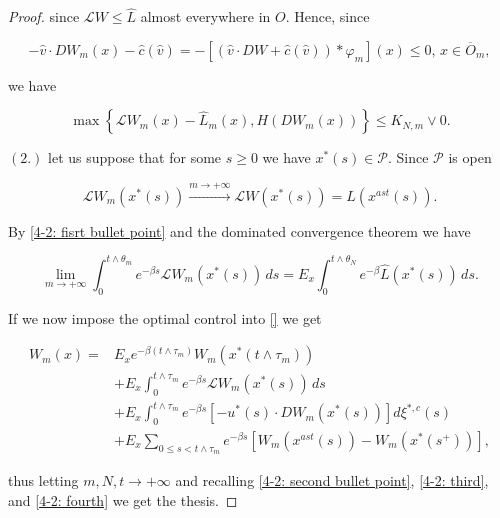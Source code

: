 \begin{theorem}
\begin{proof}
        since $\mathcal{L}W\leq \hat{L}$ almost everywhere in $O$. Hence, since

        \[-\hat{v}\cdot DW_m(x) - \hat{c}(\hat{v}) = - [(\hat{v}\cdot DW + \hat{c}(\hat{v}))\ast\varphi_m](x)\leq0,\,x\in\overline{O}_m,\]

        we have
        
        \begin{equation}
            \max\left\{\mathcal{L}W_m(x) - \hat{L}_m(x), H(DW_m(x))\right\} \leq K_{N,m}\lor 0.
        \end{equation}

        

        $(\textit{2}.)$ let us suppose that for some $s\geq0$ we have $x^{\ast}(s)\in\mathcal{P}$. Since $\mathcal{P}$ is open

        \[\mathcal{L}W_m(x^{\ast}(s))\xrightarrow{m\to+\infty}\mathcal{L}W(x^\ast(s))=\hat{L}(x^{ast}(s)).\]

        By \ref{4-2: fisrt bullet point} and the dominated convergence theorem we have

        \begin{equation}
            \lim_{m\to+\infty}\int_0^{t\land\theta_m} e^{-\beta s}\mathcal{L}W_m(x^{\ast}(s))\,ds = E_{x}\int_0^{t\land\theta_N} e^{-\beta}\hat{L}(x^{\ast}(s))\,ds.
        \end{equation}

        If we now impose the optimal control into \eqref{} we get

        \begin{equation}
            \begin{aligned}
                W_m(x) = & E_xe^{-\beta (t\land\tau_m)}W_m(x^{\ast}(t\land\tau_m)) \\
                & + E_x \int_0^{t\land\tau_m} e^{-\beta s} \mathcal{L}W_m(x^{\ast}(s))\,ds \\
                & + E_x \int_0^{t\land\tau_m} e^{-\beta s} \left[-u^{\ast}(s)\cdot DW_m(x^{\ast}(s))\right]d\xi^{\ast,c}(s) \\
                & + E_x \sum_{0\leq s< t\land \tau_m} e^{-\beta s}\left[W_m(x^{ast}(s)) - W_m(x^{\ast}(s^+))\right],
            \end{aligned}
        \end{equation}

        thus letting $m,N,t\to+\infty$ and recalling \ref{4-2: second bullet point}, \ref{4-2: third}, and \ref{4-2: fourth} we get the thesis.
    \end{proof}
\end{theorem}


